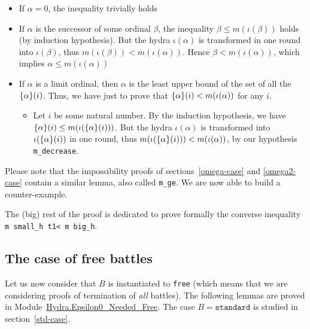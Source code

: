 \begin{itemize}
\item If $\alpha=0$, the inequality trivially holds
\item If $\alpha$ is the successor of  some ordinal $\beta$, the inequality $\beta \leq m(\iota(\beta))$ holds (by induction hypothesis). But the hydra $\iota(\alpha)$ is transformed in one round into 
$\iota(\beta)$, thus $m(\iota(\beta))<m(\iota(\alpha))$. Hence $\beta<m(\iota(\alpha))$, which implies $\alpha \leq m(\iota(\alpha))$
\item If $\alpha$ is a limit ordinal, then $\alpha$ is the least upper bound of the set
of all  the $\mbox{$\{\alpha\}(i)$}$.  Thus, we have just to prove that $\mbox{$\{\alpha\}(i)$}< m(\iota(\alpha))$ for any $i$. 
\begin{itemize}
\item Let $i$ be some natural number.
By the induction hypothesis, we have $\mbox{$\{\alpha\}(i)$} \leq m(\iota(\mbox{$\{\alpha\}(i)$}))$. But the hydra $\iota(\alpha)$ is transformed into $\iota(\mbox{$\{\alpha\}(i)$})$ in one round, thus $m(\iota(\mbox{$\{\alpha\}(i)$})) < m(\iota(\alpha))$, by our hypothesis \texttt{m\_decrease}.
\end{itemize}
\end{itemize}

Please note that the impossibility proofs of 
sections~\vref{omega-case} and \vref{omega2-case} contain a similar lemma, also called \texttt{m\_ge}.
We are now able to build a counter-example.



The (big) rest of the proof is dedicated to prove formally the converse inequality 
\texttt{m small\_h t1< m big\_h}. 

\subsection{The case of free battles}
\label{sec:free-battles-case}
Let us now consider that $B$ is instantiated to \texttt{free} (which means that we are considering proofs of termination of \emph{all} battles). The following lemmas are proved in Module~\href{../theories/html/hydras.Hydra.Epsilon0_Needed_Free.html}{Hydra.Epsilon0\_Needed\_Free}.
The case $B=\texttt{standard}$ is studied in section~\vref{std-case}.





